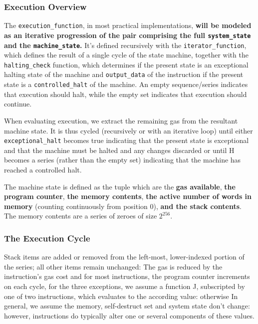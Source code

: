 \documentclass[10pt,a4paper,leqno,bibliography=totoc]{scrartcl}
\newenvironment{alphafootnotes}
{\par\edef\savedfootnotenumber{\number\value{footnote}}
\renewcommand{\thefootnote}{\alph{footnote}}
\setcounter{footnote}{0}}
{\par\setcounter{footnote}{\savedfootnotenumber}}
\begin{document}
\begin{alphafootnotes}
\begin{multicols*}{2}
				\subsubsection{Execution Overview} The \texttt{execution\_function}, in most practical implementations, \textbf{will be modeled as an iterative progression of the pair comprising the full \texttt{system\_state} and the \texttt{machine\_state}.} It's defined recursively with the \texttt{iterator\_function}, which defines the result of a single cycle of the state machine, together with the \texttt{halting\_check} function, which determines if the present state is an exceptional halting state of the machine and \texttt{output\_data} of the instruction if the present state is a \texttt{controlled\_halt} of the machine. An empty sequence/series indicates that execution should halt, while the empty set indicates that execution should continue.


				When evaluating execution, we extract the remaining gas from the resultant machine state. It is thus cycled (recursively or with an iterative loop) until either \texttt{exceptional\_halt} becomes true indicating that the present state is exceptional and that the machine must be halted and any changes discarded or until H becomes a series (rather than the empty set) indicating that the machine has reached a controlled halt. 
					
				The machine state  is defined as the tuple which are the \textbf{gas available}, \textbf{the program counter}, \textbf{the memory contents}, \textbf{the active number of words in memory} (counting continuously from position 0), \textbf{and the stack contents}. The memory contents are a series of zeroes of size $2^{256}$.\supercite{Wood2017}
				
				\subsubsection{The Execution Cycle} Stack items are added or removed from the left-most, lower-indexed portion of the series; all other items remain unchanged:  The gas is reduced by the instruction’s gas cost and for most instructions, the program counter increments on each cycle, for the three exceptions, we assume a function J, subscripted by one of two instructions, which evaluates to the according value: otherwise In general, we assume the memory, self-destruct set and system state don’t change: however, instructions do typically alter one or several components of these values. 
				

\end{multicols*}
\end{alphafootnotes}
\end{document}
